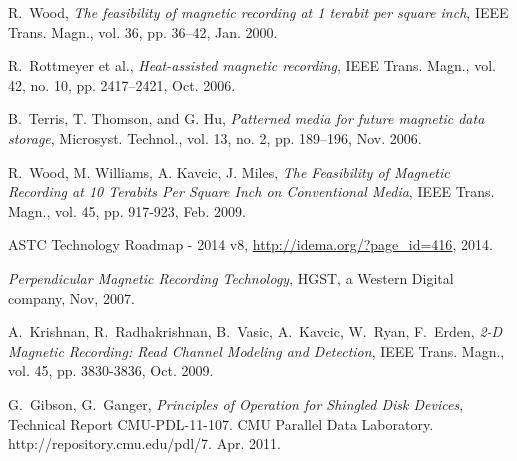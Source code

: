 \begin{thebibliography}{1}

R.~Wood, \emph{The feasibility of magnetic recording at 1 terabit per square
inch}, IEEE Trans. Magn., vol. 36, pp. 36–42, Jan. 2000.

R.~Rottmeyer et al., \emph{Heat-assisted magnetic recording}, IEEE Trans.
Magn., vol. 42, no. 10, pp. 2417–2421, Oct. 2006.

B.~Terris, T. Thomson, and G. Hu, \emph{Patterned media for future magnetic
data storage}, Microsyst. Technol., vol. 13, no. 2, pp. 189–196, Nov.
2006.

R.~Wood, M. Williams, A. Kavcic, J. Miles, \emph{The Feasibility of Magnetic Recording at 10 Terabits Per Square Inch on Conventional Media}, IEEE Trans. Magn., vol. 45, pp. 917-923, Feb. 2009.

ASTC Technology Roadmap - 2014 v8, \url{http://idema.org/?page_id=416}, 2014.

\emph{Perpendicular Magnetic Recording Technology}, HGST, a Western Digital company, Nov, 2007.

A.~Krishnan, R.~Radhakrishnan, B.~Vasic, A.~Kavcic, W.~Ryan, F.~Erden,
\emph{2-D Magnetic Recording: Read Channel Modeling and Detection}, IEEE Trans. Magn., vol. 45, pp. 3830-3836, Oct. 2009.


G.~Gibson, G.~Ganger, 
\emph{Principles of Operation for Shingled Disk Devices}, Technical Report
CMU-PDL-11-107. CMU Parallel Data Laboratory. http://repository.cmu.edu/pdl/7. Apr. 2011.


\end{thebibliography}
